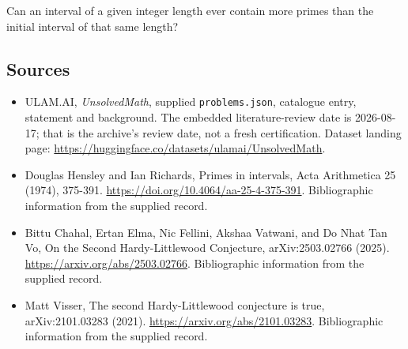 \documentclass[11pt,a4paper]{article}
\begin{document}
Can an interval of a given integer length ever contain more primes than the initial interval of that same length?

\subsection{Sources}

{\small

\begin{itemize}

\item[\hypertarget{source:statement:1}{S1}] ULAM.AI, \emph{UnsolvedMath}, supplied \texttt{problems.json}, catalogue entry, statement and background. The embedded literature-review date is 2026-08-17; that is the archive’s review date, not a fresh certification. Dataset landing page: \url{https://huggingface.co/datasets/ulamai/UnsolvedMath}.

\item[\hypertarget{source:statement:2}{S2}] Douglas Hensley and Ian Richards, Primes in intervals, Acta Arithmetica 25 (1974), 375-391. \url{https://doi.org/10.4064/aa-25-4-375-391}. Bibliographic information from the supplied record.

\item[\hypertarget{source:statement:3}{S3}] Bittu Chahal, Ertan Elma, Nic Fellini, Akshaa Vatwani, and Do Nhat Tan Vo, On the Second Hardy-Littlewood Conjecture, arXiv:2503.02766 (2025). \url{https://arxiv.org/abs/2503.02766}. Bibliographic information from the supplied record.

\item[\hypertarget{source:statement:4}{S4}] Matt Visser, The second Hardy-Littlewood conjecture is true, arXiv:2101.03283 (2021). \url{https://arxiv.org/abs/2101.03283}. Bibliographic information from the supplied record.

\end{itemize}

}

\label{end:statement}
\end{document}
